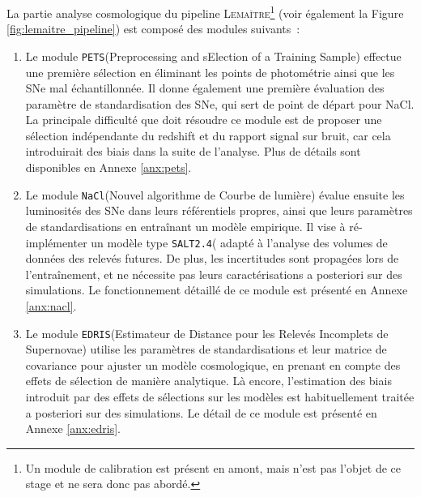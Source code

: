 \documentclass{book}
\def\lemaitre{\textsc{Lemaître}\xspace}
\def\pets{\texttt{PETS}\xspace}
\def\nacl{\texttt{NaCl}\xspace}
\def\edris{\texttt{EDRIS}\xspace}
\def\saltd{\texttt{SALT2.4}\xspace}
\begin{document}
La partie analyse cosmologique du pipeline \lemaitre \footnote{Un module de calibration est présent en amont, mais n'est pas l'objet de ce stage et ne sera donc pas abordé.} (voir également la Figure \ref{fig:lemaitre_pipeline}) est composé des modules suivants~:
\begin{enumerate}
    \item Le module \pets (Preprocessing and sElection of a Training Sample) effectue une première sélection en éliminant les points de photométrie ainsi que les SNe mal échantillonnée. Il donne également une première évaluation des paramètre de standardisation des SNe, qui sert de point de départ pour NaCl. La principale difficulté que doit résoudre ce module est de proposer une sélection indépendante du redshift et du rapport signal sur bruit, car cela introduirait des biais dans la suite de l'analyse. Plus de détails sont disponibles en Annexe \ref{anx:pets}.
    \item Le module \nacl (Nouvel algorithme de Courbe de lumière) évalue ensuite les luminosités des SNe dans leurs référentiels propres, ainsi que leurs paramètres de standardisations en entraînant un modèle empirique. Il vise à ré-implémenter un modèle type \saltd ( adapté à l'analyse des volumes de données des relevés futures. De plus, les incertitudes sont propagées lors de l'entraînement, et ne nécessite pas leurs caractérisations a posteriori sur des simulations. Le fonctionnement détaillé de ce module est présenté en Annexe \ref{anx:nacl}.
    \item Le module \edris (Estimateur de Distance pour les Relevés Incomplets de Supernovae) utilise les paramètres de standardisations et leur matrice de covariance pour ajuster un modèle cosmologique, en prenant en compte des effets de sélection de manière analytique. Là encore, l'estimation des biais introduit par des effets de sélections sur les modèles est habituellement traitée a posteriori sur des simulations. Le détail de ce module est présenté en Annexe \ref{anx:edris}.
\end{enumerate}
\end{document}
